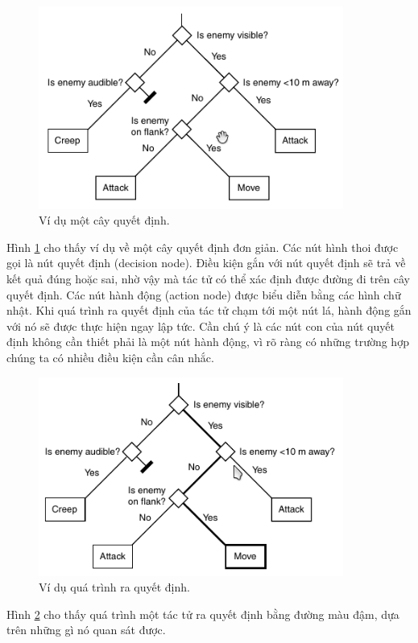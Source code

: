 \documentclass[12pt]{report}
\begin{document}
\begin{figure}[h]
  \centering
    \includegraphics[width=10cm]{Pics/Chap5/dectree.png}
  \caption{Ví dụ một cây quyết định\cite{aiforgames}.}
  \label{fig:dectreeexample}
\end{figure}

Hình \ref{fig:dectreeexample} cho thấy ví dụ về một cây quyết định đơn giản. Các nút hình thoi được gọi là nút quyết định (decision node). Điều kiện gắn với nút quyết định sẽ trả về kết quả đúng hoặc sai, nhờ vậy mà tác tử có thể xác định được đường đi trên cây quyết định. Các nút hành động (action node) được biểu diễn bằng các hình chữ nhật. Khi quá trình ra quyết định của tác tử chạm tới một nút lá, hành động gắn với nó sẽ được thực hiện ngay lập tức. Cần chú ý là các nút con của nút quyết định không cần thiết phải là một nút hành động, vì rõ ràng có những trường hợp chúng ta có nhiều điều kiện cần cân nhắc.

\begin{figure}[h]
  \centering
    \includegraphics[width=10cm]{Pics/Chap5/dectreetravelled.png}
  \caption{Ví dụ quá trình ra quyết định.}
  \label{fig:dectree2example}
\end{figure}

Hình \ref{fig:dectree2example} cho thấy quá trình một tác tử ra quyết định bằng đường màu đậm, dựa trên những gì nó quan sát được.
\end{document}
